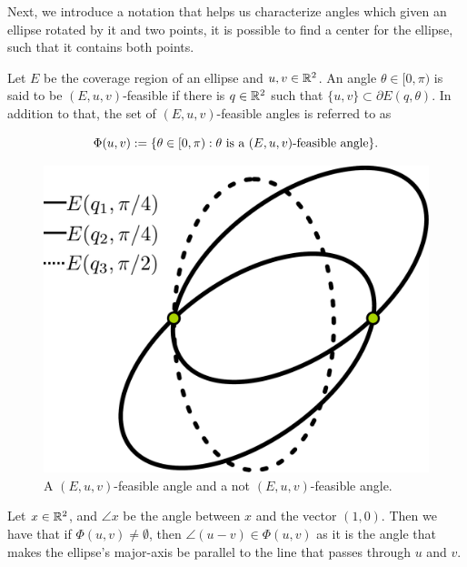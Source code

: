
Next, we introduce a notation that helps us characterize angles which given an ellipse rotated by it and two points, it is possible to find a center for the ellipse, such that it contains both points.

\begin{definition}\label{def:feasible_angle}
	Let $E$ be the coverage region of an ellipse and $u, v \in \mathbb{R}^2$. An angle $\theta \in [0, \pi)$ is said to be $(E, u, v)$-feasible if there is $q \in \mathbb{R}^2$ such that $\{u, v\} \subset \partial E(q, \theta)$.
	In addition to that, the set of $(E, u, v)$-feasible angles is referred to as 
	
	\begin{equation*}
	\Phi(u, v) := \{\theta \in [0, \pi) : \theta \textnormal{ is a } (E,u,v)\textnormal{-feasible angle}\}.
	\end{equation*}
\end{definition}

\begin{figure}[H]
	\centering
	\includegraphics[scale=.22]{figures/feasible-angle2}
	\caption{A $(E, u, v)$-feasible angle and a not $(E, u, v)$-feasible angle.}
	\label{fig:feasible-angle}
\end{figure}
Let $x\in\mathbb{R}^2$, and $\angle x$ be the angle between $x$ and the vector $(1,0)$. Then we have that if $\Phi(u,v)\neq\emptyset$, then $\angle(u-v)\in  \Phi(u,v)$ as it is the angle that makes the ellipse's major-axis be parallel to the line that passes through $u$ and $v$. 

